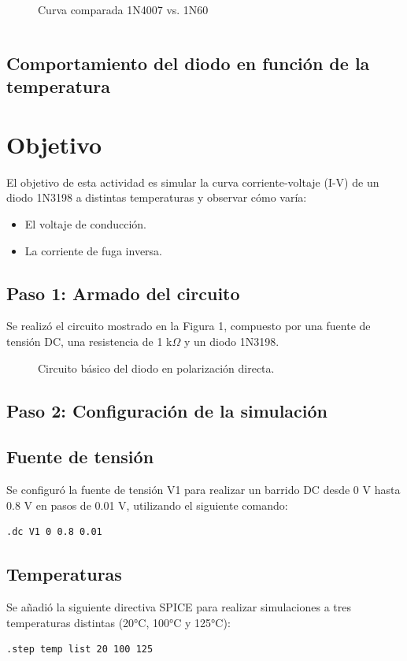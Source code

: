 \begin{figure}[H]
    \centering
    \caption{Curva comparada 1N4007 vs. 1N60}
\end{figure}

\[ 
\]
\subsection{Comportamiento del diodo en función de la temperatura}
\section*{Objetivo}
El objetivo de esta actividad es simular la curva corriente-voltaje (I-V) de un diodo 1N3198 a distintas temperaturas y observar cómo varía:
\begin{itemize}
    \item El voltaje de conducción.
    \item La corriente de fuga inversa.
\end{itemize}

\subsection{Paso 1: Armado del circuito}
Se realizó el circuito mostrado en la Figura 1, compuesto por una fuente de tensión DC, una resistencia de 1 k$\Omega$ y un diodo 1N3198.

\begin{figure}[H]
    \centering
    \caption{Circuito básico del diodo en polarización directa.}
\end{figure}

\subsection{Paso 2: Configuración de la simulación}

\subsection*{Fuente de tensión}
Se configuró la fuente de tensión V1 para realizar un barrido DC desde 0 V hasta 0.8 V en pasos de 0.01 V, utilizando el siguiente comando:
\begin{verbatim}
.dc V1 0 0.8 0.01
\end{verbatim}

\subsection*{Temperaturas}
Se añadió la siguiente directiva SPICE para realizar simulaciones a tres temperaturas distintas (20°C, 100°C y 125°C):
\begin{verbatim}
.step temp list 20 100 125
\end{verbatim}

